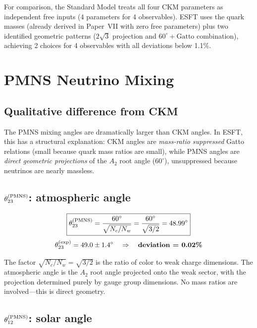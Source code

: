 ﻿\documentclass[prd,twocolumn,showpacs,superscriptaddress,groupedaddress]{revtex4-2}
\begin{document}
For comparison, the Standard Model treats all four CKM parameters as independent free inputs (4 parameters for 4 observables). ESFT uses the quark masses (already derived in Paper~VII with zero free parameters) plus two identified geometric patterns ($2\sqrt{3}$ projection and $60^\circ + \text{Gatto}$ combination), achieving 2 choices for 4 observables with all deviations below 1.1\%.

\section{PMNS Neutrino Mixing}

\subsection{Qualitative difference from CKM}

The PMNS mixing angles are dramatically larger than CKM angles. In ESFT, this has a structural explanation: CKM angles are \emph{mass-ratio suppressed} Gatto relations (small because quark mass ratios are small), while PMNS angles are \emph{direct geometric projections} of the $A_2$ root angle ($60^\circ$), unsuppressed because neutrinos are nearly massless.

\subsection{$\theta_{23}^{(\rm PMNS)}$: atmospheric angle}

\begin{equation}
\boxed{\theta_{23}^{(\rm PMNS)} = \frac{60^\circ}{\sqrt{N_c/N_w}} = \frac{60^\circ}{\sqrt{3/2}} = 48.99^\circ}
\end{equation}
\begin{equation}
\theta_{23}^{(\rm exp)} = 49.0 \pm 1.4^\circ \quad \Rightarrow \quad \textbf{deviation = 0.02\%}
\end{equation}

The factor $\sqrt{N_c/N_w} = \sqrt{3/2}$ is the ratio of color to weak charge dimensions. The atmospheric angle is the $A_2$ root angle projected onto the weak sector, with the projection determined purely by gauge group dimensions. No mass ratios are involved---this is direct geometry.

\subsection{$\theta_{12}^{(\rm PMNS)}$: solar angle}
\end{document}
